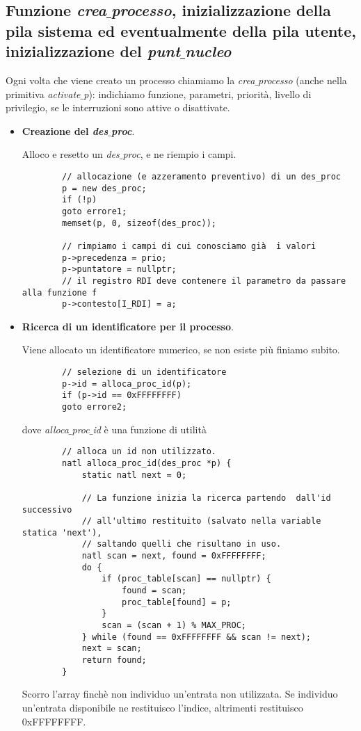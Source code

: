 \subsection{Funzione \emph{crea$\_$processo}, inizializzazione della pila sistema ed eventualmente della pila utente, inizializzazione del \emph{punt$\_$nucleo}}
Ogni volta che viene creato un processo chiamiamo la \emph{crea$\_$processo} (anche nella primitiva \emph{activate$\_$p}): indichiamo funzione, parametri, priorità, livello di privilegio, se le interruzioni sono attive o disattivate.
\begin{itemize}
	\item \textbf{Creazione del \emph{des$\_$proc}}.
	
	Alloco e resetto un \emph{des$\_$proc}, e ne riempio i campi.
	\small
	\begin{verbatim}
		// allocazione (e azzeramento preventivo) di un des_proc
		p = new des_proc;
		if (!p)
		goto errore1;
		memset(p, 0, sizeof(des_proc));
		
		// rimpiamo i campi di cui conosciamo già  i valori
		p->precedenza = prio;
		p->puntatore = nullptr;
		// il registro RDI deve contenere il parametro da passare alla funzione f
		p->contesto[I_RDI] = a;
	\end{verbatim}
	\normalsize
	\item \textbf{Ricerca di un identificatore per il processo}.
	
	Viene allocato un identificatore numerico, se non esiste più finiamo subito.
	\small
	\begin{verbatim}
		// selezione di un identificatore
		p->id = alloca_proc_id(p);
		if (p->id == 0xFFFFFFFF)
		goto errore2;
	\end{verbatim}
	\normalsize 
	dove \emph{alloca$\_$proc$\_$id} è una funzione di utilità
	\small
	\begin{verbatim}
		// alloca un id non utilizzato.
		natl alloca_proc_id(des_proc *p) {
			static natl next = 0;
			
			// La funzione inizia la ricerca partendo  dall'id successivo
			// all'ultimo restituito (salvato nella variable statica 'next'),
			// saltando quelli che risultano in uso.
			natl scan = next, found = 0xFFFFFFFF;
			do {
				if (proc_table[scan] == nullptr) {
					found = scan;
					proc_table[found] = p;
				}
				scan = (scan + 1) % MAX_PROC;
			} while (found == 0xFFFFFFFF && scan != next);
			next = scan;
			return found;
		}
	\end{verbatim}
	\normalsize 
	Scorro l'array finchè non individuo un'entrata non utilizzata. Se individuo un'entrata disponibile ne restituisco l'indice, altrimenti restituisco 0xFFFFFFFF.
	

\end{itemize}
